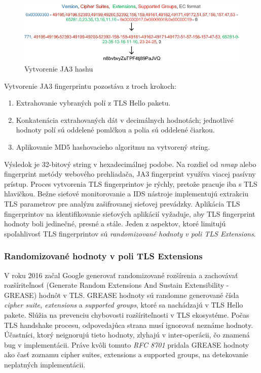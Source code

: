 \begin{figure}[!ht]
 \includegraphics[width=1\textwidth]{obrazky-figures/ja3hash.png}
\caption{Vytvorenie JA3 hashu\cite{ja3}}
\centering
\label{ja3hash}
\end{figure}

Vytvorenie JA3 fingerprintu pozostáva z troch krokoch:
\begin{enumerate}
    \item Extrahovanie vybraných polí z TLS Hello paketu.
    \item Konkatenácia extrahovaných dát v decimálnych hodnotách; jednotlivé hodnoty polí sú oddelené pomlčkou a polia sú oddelené čiarkou.
    \item Aplikovanie MD5 hashovacieho algoritmu na vytvorený string.
\end{enumerate}

Výsledok je 32-bitový string v hexadecimálnej podobe. Na rozdiel od \emph{nmap} alebo fingerprint metódy webového prehliadača, JA3 fingerprint využíva viacej pasívny prístup. Proces vytvorenia TLS fingerprintov je rýchly, pretože pracuje iba s TLS hlavičkou. Bežne sieťové monitorovanie a IDS nástroje implementujú extrakciu TLS parametrov pre analýzu zašifrovanej sieťovej prevádzky. Aplikácia TLS fingerprintov na identifikovanie sieťových aplikácií vyžaduje, aby TLS fingerprint hodnoty boli jedinečné, presné a stále. Jeden z aspektov, ktoré limitujú spoľahlivosť TLS fingerprintov sú \emph{randomizované hodnoty v poli TLS Extensions}.\cite{ja3}
\subsubsection{Randomizované hodnoty v poli TLS Extensions}
V roku 2016 začal Google  generovať randomizované rozšírenia a zachovávať rozšíriteľnosť  (Generate Random Extensions And Sustain Extensibility - GREASE) hodnôt v TLS. GREASE hodnoty sú randomne generované čísla \emph{cipher suite, extensions} a \emph{supported groups}, ktoré sa nachádzajú v TLS Hello pakete. Slúžia na prevenciu chybovosti rozšíriteľnosti v TLS ekosystéme. Počas TLS handshake procesu, odpovedajúca strana musí ignorovať neznáme hodnoty. Účastníci, ktorý neignorujú tieto hodnoty, zlyhajú v inter-operácii, čo znamená bug v implementácii. Práve kvôli tomuto \emph{RFC 8701} pridala GREASE hodnoty ako časť zoznamu cipher suites, extensions a supported groups, na detekovanie neplatných implementácii.\cite{ja3}
